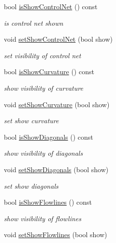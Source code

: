 \begin{DoxyCompactItemize}
bool \hyperlink{classShipCAD_1_1Visibility_a177cc880657723c1cbcc4c66c16ee208}{is\-Show\-Control\-Net} () const 
\begin{DoxyCompactList}\small\item\em is control net shown \end{DoxyCompactList}\item 
void \hyperlink{classShipCAD_1_1Visibility_a7498435ee6955772713b113a63279260}{set\-Show\-Control\-Net} (bool show)
\begin{DoxyCompactList}\small\item\em set visibility of control net \end{DoxyCompactList}\item 
bool \hyperlink{classShipCAD_1_1Visibility_a36f2e03d75a5a2cfcfc3c637c08bee92}{is\-Show\-Curvature} () const 
\begin{DoxyCompactList}\small\item\em show visibility of curvature \end{DoxyCompactList}\item 
void \hyperlink{classShipCAD_1_1Visibility_a72fa3ed8c721fffe65b29c61329a1d35}{set\-Show\-Curvature} (bool show)
\begin{DoxyCompactList}\small\item\em set show curvature \end{DoxyCompactList}\item 
bool \hyperlink{classShipCAD_1_1Visibility_afa9ae51a7f178d93fe7d6b12ea5a4e63}{is\-Show\-Diagonals} () const 
\begin{DoxyCompactList}\small\item\em show visibility of diagonals \end{DoxyCompactList}\item 
void \hyperlink{classShipCAD_1_1Visibility_a02ff571862dacdbec3248a80ec42eb4f}{set\-Show\-Diagonals} (bool show)
\begin{DoxyCompactList}\small\item\em set show diagonals \end{DoxyCompactList}\item 
bool \hyperlink{classShipCAD_1_1Visibility_a39e12b36d20e2e3ad750e18c248a04f5}{is\-Show\-Flowlines} () const 
\begin{DoxyCompactList}\small\item\em show visibility of flowlines \end{DoxyCompactList}\item 
void \hyperlink{classShipCAD_1_1Visibility_a805b3f5f4a8d7c6b578a79c2539cf192}{set\-Show\-Flowlines} (bool show)

\end{DoxyCompactItemize}
